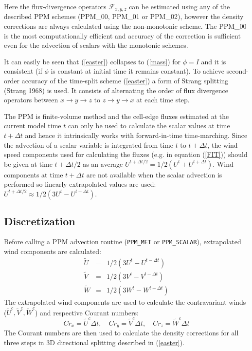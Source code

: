   Here the flux-divergence operators $\mathcal{F}_{x,y,z}$ can be
  estimated using any of the described PPM schemes (PPM\_00, PPM\_01 or
  PPM\_02), however the density corrections are always calculated using
  the non-monotonic scheme. The PPM\_00 is the most computationally
  efficient and accuracy of the correction is sufficient even for the
  advection of scalars with the monotonic schemes. 

  It can easily be seen that (\ref{easter}) collapses to (\ref{mass}) for
  $\phi = I$ and it is consistent (if $\phi$ is constant at initial time
  it remains constant). To achieve second-order accuracy of the
  time-split scheme (\ref{easter}) a form of Strang splitting (Strang
  1968) is used. It consists of alternating the order of flux divergence
  operators between $x \rightarrow y \rightarrow z$ to $z \rightarrow y
  \rightarrow x$ at each time step.

  The PPM is finite-volume method and the cell-edge fluxes estimated at
  the current model time $t$ can only be used to calculate the scalar
  values at time $t+\Delta t$ and hence it intrinsically works with
  forward-in-time time-marching. Since the advection of a scalar
  variable is integrated from time $t$ to $t+\Delta t$, the wind-speed
  components used for calculating the fluxes (e.g. in equation
  (\ref{FIT})) should be given at time $t+\Delta t/2$ as an average
  $U^{t+\Delta t/2} = 1/2(U^{t}+U^{t+\Delta t})$. Wind components at
  time $t+\Delta t$ are not available when the scalar advection is
  performed so linearly extrapolated values are used: $U^{t+\Delta t/2}
  \approx 1/2(3U^{t} - U^{t-\Delta t})$.

\subsection{Discretization}

Before calling a PPM advection routine (\texttt{PPM\_MET} or
\texttt{PPM\_SCALAR}), extrapolated wind components are calculated:
\begin{eqnarray}
 \tilde{U} &=& 1/2(3 U^{t} - U^{t-\Delta t})\\
 \tilde{V} &=& 1/2(3 V^{t} - V^{t-\Delta t})\\
 \tilde{W} &=& 1/2(3 W^{t} - W^{t-\Delta t})
\end{eqnarray}
The extrapolated wind components are used to calculate the contravariant
winds ($\tilde{U}^{c}, \tilde{V}^{c}, \tilde{W}^{c}$) and respective
Courant numbers: 
\begin{equation}
Cr_{x} = \tilde{U}^{c} \Delta t, \quad Cr_{y} = \tilde{V}^{c} \Delta t,
\quad Cr_{z} = \tilde{W}^{c} \Delta t
\end{equation}
The Courant numbers are then used to calculate the density corrections
for all three steps in 3D directional splitting described in
(\ref{easter}). 

